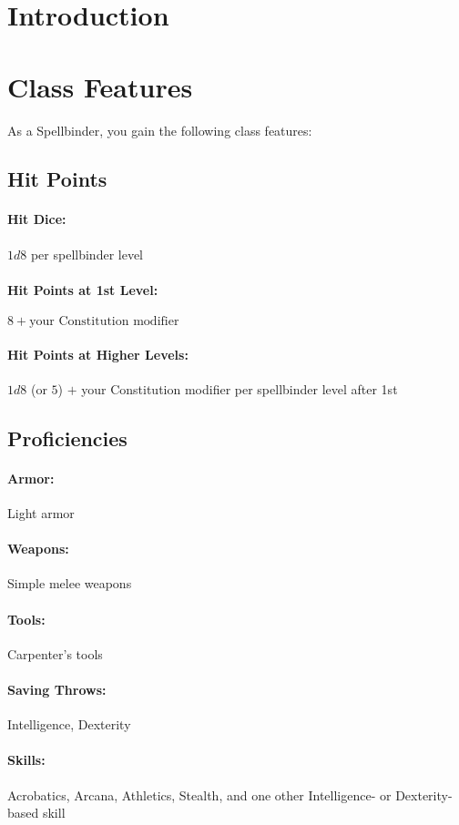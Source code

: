 \section{Introduction}

\section{Class Features}

As a Spellbinder, you gain the following class features:

\subsection{Hit Points}
\paragraph{Hit Dice:} $1d8$ per spellbinder level
\paragraph{Hit Points at 1st Level:} $8 +\text{your Constitution modifier}$
\paragraph{Hit Points at Higher Levels:} $1d8$ (or $5$) $+$ your Constitution modifier per spellbinder level after 1st

\subsection{Proficiencies}
\paragraph{Armor:} Light armor
\paragraph{Weapons:} Simple melee weapons
\paragraph{Tools:} Carpenter's tools
\paragraph{Saving Throws:} Intelligence, Dexterity
\paragraph{Skills:} Acrobatics, Arcana, Athletics, Stealth, and one other Intelligence- or Dexterity-based skill

